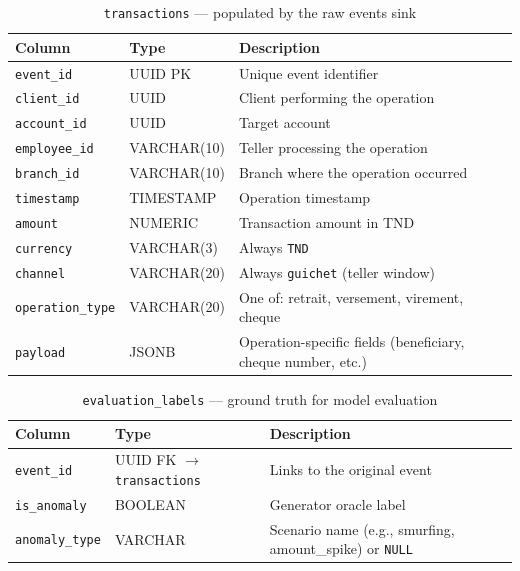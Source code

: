 \begin{table}[H]
\centering
\caption{\texttt{transactions} --- populated by the raw events sink}
\label{tab:transactions-table}
\begin{tabularx}{\textwidth}{@{}llX@{}}
\toprule
\textbf{Column} & \textbf{Type} & \textbf{Description} \\
\midrule
\texttt{event\_id}       & UUID PK      & Unique event identifier \\
\texttt{client\_id}      & UUID         & Client performing the operation \\
\texttt{account\_id}     & UUID         & Target account \\
\texttt{employee\_id}    & VARCHAR(10)  & Teller processing the operation \\
\texttt{branch\_id}      & VARCHAR(10)  & Branch where the operation occurred \\
\texttt{timestamp}       & TIMESTAMP    & Operation timestamp \\
\texttt{amount}          & NUMERIC      & Transaction amount in TND \\
\texttt{currency}        & VARCHAR(3)   & Always \texttt{TND} \\
\texttt{channel}         & VARCHAR(20)  & Always \texttt{guichet} (teller window) \\
\texttt{operation\_type} & VARCHAR(20)  & One of: retrait, versement, virement, cheque \\
\texttt{payload}         & JSONB        & Operation-specific fields (beneficiary, cheque number, etc.) \\
\bottomrule
\end{tabularx}
\end{table}

\begin{table}[H]
\centering
\caption{\texttt{evaluation\_labels} --- ground truth for model evaluation}
\label{tab:eval-labels}
\begin{tabularx}{\textwidth}{@{}llX@{}}
\toprule
\textbf{Column} & \textbf{Type} & \textbf{Description} \\
\midrule
\texttt{event\_id}     & UUID FK $\rightarrow$ \texttt{transactions} & Links to the original event \\
\texttt{is\_anomaly}   & BOOLEAN  & Generator oracle label \\
\texttt{anomaly\_type} & VARCHAR  & Scenario name (e.g., smurfing, amount\_spike) or \texttt{NULL} \\
\bottomrule
\end{tabularx}
\end{table}

